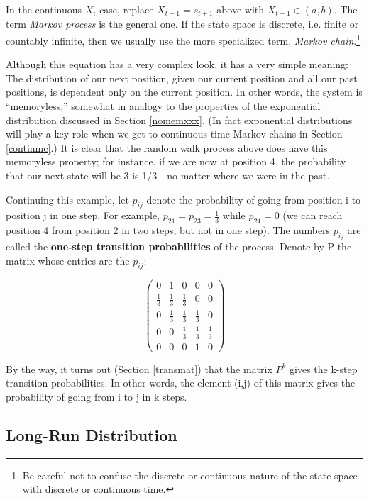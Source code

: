 In the continuous $X_i$ case, replace $X_{t+1}=s_{t+1}$ above with
$X_{t+1} \in (a,b)$.  The term {\it Markov process} is the general one.
If the state space is discrete, i.e. finite or countably infinite, then
we usually use the more specialized term, {\it Markov chain}.\footnote{Be 
careful not to confuse the discrete or continuous
nature of the state space with discrete or continuous time.}

Although this equation has a very complex look, it has a very simple
meaning: The distribution of our next position, given our current
position and all our past positions, is dependent only on the current
position.  In other words, the system is ``memoryless,'' somewhat in
analogy to the properties of the exponential distribution discussed in
Section \ref{nomemxxx}.  (In fact exponential distributions will play a
key role when we get to continuous-time Markov chains in Section
\ref{continmc}.)  It is clear that the random walk process above does
have this memoryless property; for instance, if we are now at position
4, the probability that our next state will be 3 is 1/3---no matter
where we were in the past.

Continuing this example, let $p_{ij}$ denote the probability of going
from position i to position j in one step. For example,
$p_{21}=p_{23}=\frac{1}{3}$ while $p_{24}=0$ (we can reach position 4
from position 2 in two steps, but not in one step). The numbers $p_{ij}$
are called the \textbf{one-step transition probabilities} of the
process. Denote by P the matrix whose entries are the $p_{ij}$:

\begin{equation} 
\label{p}
\begin{pmatrix} 
0 & 1 & 0 & 0 & 0 \\ 
\frac{1}{3} & \frac{1}{3} & \frac{1}{3} & 0 & 0 \\ 
0 & \frac{1}{3} & \frac{1}{3} & \frac{1}{3} & 0 \\
0 & 0 & \frac{1}{3} & \frac{1}{3} & \frac{1}{3} \\
0 & 0 & 0 & 1 & 0 
\end{pmatrix}
\end{equation}

By the way, it turns out (Section \ref{transmat}) that the matrix $P^{k}$
gives the k-step transition probabilities. In other words, the element
(i,j) of this matrix gives the probability of going from i to j in k
steps. 

\subsection{Long-Run Distribution}
\label{discpi}

